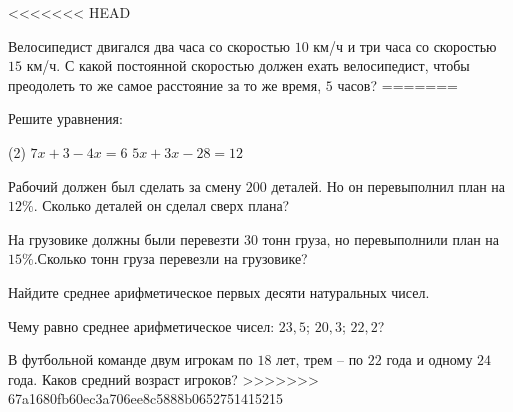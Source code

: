 \begin{homework}[number=1]
	\begin{listofex}
<<<<<<< HEAD
		\item Велосипедист двигался два часа со скоростью \( 10 \) км/ч  и три часа со скоростью \( 15 \) км/ч. С какой постоянной скоростью должен  ехать велосипедист, чтобы преодолеть то же самое расстояние за то же время, \( 5 \) часов?    
=======
		\item Решите уравнения:
		\begin{tasks}(2)
			\task \( 7x +3 - 4x = 6 \)
			\task \( 5x +3x - 28 = 12 \)
		\end{tasks}
		\item Рабочий должен был сделать за смену \( 200 \) деталей. Но он перевыполнил план на \( 12\% \). Сколько деталей он сделал сверх плана?
		\item На грузовике должны были перевезти \( 30 \) тонн груза, но перевыполнили план на \( 15\% \).Сколько тонн груза перевезли на грузовике?
		\item Найдите среднее арифметическое первых десяти натуральных чисел.
		\item Чему равно среднее арифметическое чисел: \( 23,5 \); \( 20,3 \); \( 22,2 \)?
		\item В футбольной команде двум игрокам по \( 18 \) лет, трем – по \( 22 \) года и одному \( 24 \) года. Каков средний возраст игроков?
>>>>>>> 67a1680fb60ec3a706ee8c5888b0652751415215
	\end{listofex}
\end{homework}

